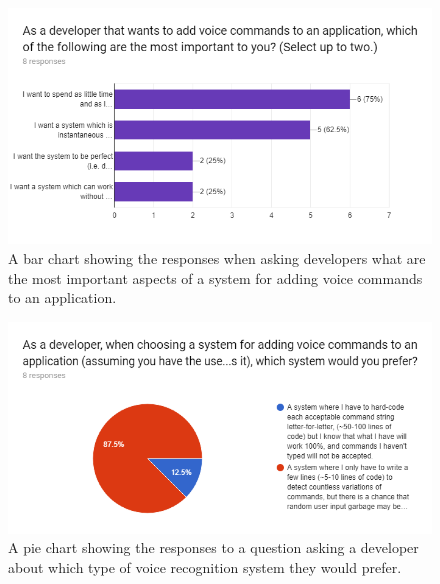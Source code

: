 \documentclass[11pt]{article}
\begin{document}
\begin{center}
\begin{figure}[H]
\begin{center}
  \includegraphics[width=\linewidth]{survey-important}
  \caption{A bar chart showing the responses when asking developers what are the most important aspects of a system for adding voice commands to an application.}
  \label{fig:survey-important}
  \end{center}
\end{figure}
\end{center}

\begin{center}
\begin{figure}[H]
\begin{center}
  \includegraphics[width=\linewidth]{survey-tradeoff}
  \caption{A pie chart showing the responses to a question asking a developer about which type of voice recognition system they would prefer.}
  \label{fig:survey-tradeoff}
  \end{center}
\end{figure}
\end{center}
\end{document}
